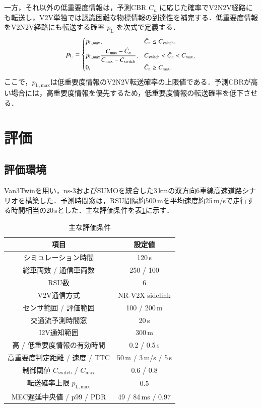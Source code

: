 \documentclass{fitj}
\begin{document}
一方，それ以外の低重要度情報は，予測CBR $\hat{C}_{n}$ に応じた確率でV2N2V経路にも転送し，V2V単独では認識困難な物標情報の到達性を補完する．低重要度情報をV2N2V経路にも転送する確率 $p_{\mathrm{L}}$ を次式で定義する．
\begin{equation}
{\small
p_{\mathrm{L}} =
\begin{cases}
p_{\mathrm{L,max}}, & \hat{C}_{n} \le C_{\mathrm{switch}}, \\[2pt]
p_{\mathrm{L,max}}\dfrac{C_{\max}-\hat{C}_{n}}{C_{\max}-C_{\mathrm{switch}}}, & C_{\mathrm{switch}}<\hat{C}_{n}<C_{\max}, \\[2pt]
0, & \hat{C}_{n} \ge C_{\max}.
\end{cases}}
\end{equation}
ここで，$p_{\mathrm{L,max}}$は低重要度情報のV2N2V転送確率の上限値である．予測CBRが高い場合には，高重要度情報を優先するため，低重要度情報の転送確率を低下させる．

\section{評価}

\subsection{評価環境}
Van3Twinを用い，ns-3およびSUMOを統合した3\,kmの双方向6車線高速道路シナリオを構築した．予測時間窓は，RSU間隔約500\,mを平均速度約25\,m/sで走行する時間相当の20\,sとした．主な評価条件を表\ref{tab:condition}に示す．

\begin{table}[t]
\centering
\caption{主な評価条件}
\label{tab:condition}
\small
\begin{tabular}{cc}
\hline
項目 & 設定値 \\ \hline \hline
シミュレーション時間 & 120\,s \\
総車両数 / 通信車両数 & 250 / 100 \\
RSU数 & 6 \\
V2V通信方式 & NR-V2X sidelink \\
センサ範囲 / 評価範囲 & 100 / 200\,m \\
交通流予測時間窓 & 20\,s \\
I2V通知範囲 & 300\,m \\
高 / 低重要度情報の有効時間 & 0.2 / 0.5\,s \\
高重要度判定距離 / 速度 / TTC & 50\,m / 3\,m/s / 5\,s \\
制御閾値 $C_{\mathrm{switch}}$ / $C_{\max}$ & 0.6 / 0.8 \\
転送確率上限 $p_{\mathrm{L,max}}$ & 0.5 \\
MEC遅延中央値 / p99 / PDR & 49 / 84\,ms / 0.97 \\ \hline
\end{tabular}
\end{table}
\end{document}
